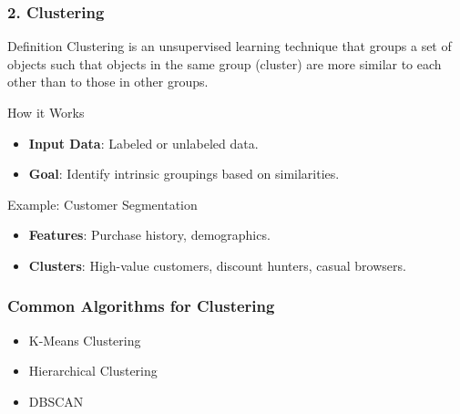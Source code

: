 \documentclass[aspectratio=169]{beamer}
\begin{document}
\begin{frame}[fragile]
    \frametitle{2. Clustering}
    \begin{block}{Definition}
        Clustering is an unsupervised learning technique that groups a set of objects such that objects in the same group (cluster) are more similar to each other than to those in other groups.
    \end{block}

    \begin{block}{How it Works}
        \begin{itemize}
            \item \textbf{Input Data}: Labeled or unlabeled data.
            \item \textbf{Goal}: Identify intrinsic groupings based on similarities.
        \end{itemize}
    \end{block}

    \begin{block}{Example: Customer Segmentation}
        \begin{itemize}
            \item \textbf{Features}: Purchase history, demographics.
            \item \textbf{Clusters}: High-value customers, discount hunters, casual browsers.
        \end{itemize}
    \end{block}
\end{frame}

\begin{frame}[fragile]
    \frametitle{Common Algorithms for Clustering}
    \begin{itemize}
        \item K-Means Clustering
        \item Hierarchical Clustering
        \item DBSCAN
    \end{itemize}
\end{frame}
\end{document}
